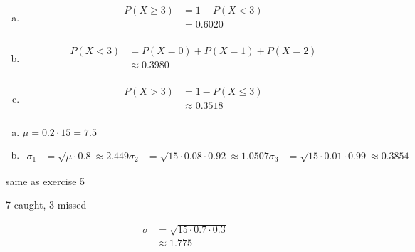 \documentclass[letterpaper, landscape]{exam}
\begin{document}
\begin{description}
\begin{enumerate}[(a)]
        \item
          \begin{align*}
            P(X \geq 3) & = 1 - P(X < 3) \\
                        & = \boxed{ 0.6020 } \\
          \end{align*}

        \item
          \begin{align*}
            P(X < 3) & = P(X = 0) + P(X = 1) + P(X = 2) \\
                     & \approx \boxed{ 0.3980 } \\
          \end{align*}

        \item
          \begin{align*}
            P(X > 3) & = 1 - P(X \leq 3) \\
                     & \approx \boxed{ 0.3518 } \\
          \end{align*}
      \end{enumerate}
      
    \item[13.7]
      \begin{enumerate}[(a)]
        \item $\mu = 0.2 \cdot 15 = \boxed{ 7.5 }$
        \item 
          \begin{align*}
            \sigma_1 & = \sqrt{\mu \cdot 0.8} \approx \boxed{ 2.449 }
            \sigma_2 & = \sqrt{15 \cdot 0.08 \cdot 0.92} \approx \boxed{ 1.0507 }
            \sigma_3 & = \sqrt{15 \cdot 0.01 \cdot 0.99} \approx \boxed{ 0.3854 }
          \end{align*}
      \end{enumerate}

    \item[13.8]
      \begin{itemize*}
        \item same as exercise 5
        \item 7 caught, 3 missed
        \item
          \begin{align*}
            \sigma & = \sqrt{15 \cdot 0.7 \cdot 0.3} \\
                   & \approx \boxed{ 1.775 } \\
          \end{align*}
      \end{itemize*}
  \end{description}
\end{document}
